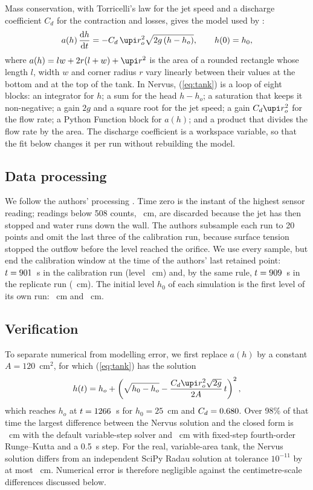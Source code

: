 \documentclass{jfm}
\begin{document}
Mass conservation, with Torricelli's law for the jet speed and a discharge coefficient $C_d$ for the contraction
and losses, gives the model used by \citet{Fabusola2025}:
\begin{equation}
  a(h)\,\frac{\mathrm{d}h}{\mathrm{d}t} = -C_d\,\upi r_o^2 \sqrt{2g\,(h-h_o)}, \qquad h(0) = h_0,
  \label{eq:tank}
\end{equation}
where $a(h) = lw + 2r(l+w) + \upi r^2$ is the area of a rounded rectangle whose length $l$, width $w$ and corner
radius $r$ vary linearly between their values at the bottom and at the top of the tank. In Nervus,
(\ref{eq:tank}) is a loop of eight blocks: an integrator for $h$; a sum for the head $h-h_o$; a saturation that
keeps it non-negative; a gain $2g$ and a square root for the jet speed; a gain $C_d\upi r_o^2$ for the flow
rate; a Python Function block for $a(h)$; and a product that divides the flow rate by the area. The
discharge coefficient is a workspace variable, so that the fit below changes it per run without rebuilding the
model.

\subsection{Data processing}

We follow the authors' processing \citep{FabusolaData}. Time zero is the instant of the highest sensor reading;
readings below 508 counts, \HCountsMin~cm, are discarded because the jet has then stopped and water runs down the
wall. The authors subsample each run to 20 points and omit the last three of the calibration run, because surface
tension stopped the outflow before the level reached the orifice. We use every sample, but end the calibration
window at the time of the authors' last retained point: $t = 901$~s in the calibration run (level
\TrainHcut~cm) and, by the same rule, $t = 909$~s in the replicate run (\TestHcut~cm). The initial level
$h_0$ of each simulation is the first level of its own run: \TrainHzero~cm and \TestHzero~cm.

\subsection{Verification}

To separate numerical from modelling error, we first replace $a(h)$ by a constant $A = 120$~cm$^2$, for which
(\ref{eq:tank}) has the solution
\begin{equation}
  h(t) = h_o + \left( \sqrt{h_0-h_o} - \frac{C_d \upi r_o^2 \sqrt{2g}}{2A}\,t \right)^2 ,
\end{equation}
which reaches $h_o$ at $t = 1266$~s for $h_0 = 25$~cm and $C_d = 0.680$. Over 98\% of that time the largest
difference between the Nervus solution and the closed form is \VerAuto~cm with the default variable-step solver
and \VerRKfour~cm with fixed-step fourth-order Runge--Kutta and a 0.5~s step. For the real, variable-area tank,
the Nervus solution differs from an independent SciPy Radau solution at tolerance $10^{-11}$ by at most \VerScipy~cm.
Numerical error is therefore negligible against the centimetre-scale differences discussed below.
\end{document}
